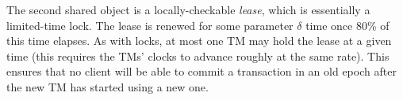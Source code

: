 The second shared object is a locally-checkable \emph{lease}, which is essentially a  limited-time lock.
The lease is renewed for some parameter $\delta$  time once 80\% of this time elapses.
As with locks, at most one TM may hold the lease at a given time (this requires the TMs' clocks to advance roughly at the same rate). 
This ensures that no client will be able to commit a transaction in an old epoch after the new TM has started 
using a new one.



